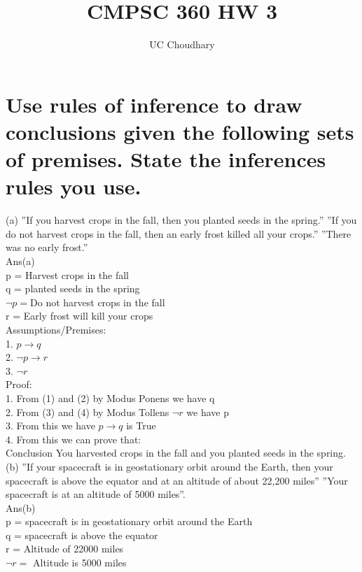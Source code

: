 \documentclass{article}
\title{CMPSC 360 HW 3}
\author{UC Choudhary}
\begin{document}
\maketitle



\section{Use rules of inference to draw conclusions given the following sets of premises. State the inferences rules you use.}


\Large (a) ”If you harvest crops in the fall, then you planted seeds in the spring.” ”If you do not
harvest crops in the fall, then an early frost killed all your crops.” ”There was no early frost.”\\

Ans(a)\\
 p = Harvest crops in the fall\\
 q = planted seeds in the spring\\
 $\neg p = $Do not harvest crops in the fall\\
 r = Early frost will kill your crops\\
 
 Assumptions/Premises:\\
 1. $p \rightarrow q$\\
 2. $\neg p \rightarrow r$\\
 3. $\neg r$\\

 Proof:\\
 1. From (1) and (2) by Modus Ponens we have q\\
 2. From (3) and (4) by Modus Tollens $\neg r$ we have p\\
 3. From this we have $p \rightarrow q$ is True\\
 4. From this we can prove that:\\
 
 Conclusion You harvested crops in the fall and you planted seeds in the spring.\\

 \Large (b) ”If your spacecraft is in geostationary orbit around the Earth, then your spacecraft is above
the equator and at an altitude of about 22,200 miles” ”Your spacecraft is at an altitude of
5000 miles”.\\

Ans(b)\\
p = spacecraft is in geostationary orbit around the Earth\\
q = spacecraft is above the equator\\
r = Altitude of 22000 miles\\
$\neg r =$ Altitude is 5000 miles\\
\end{document}
